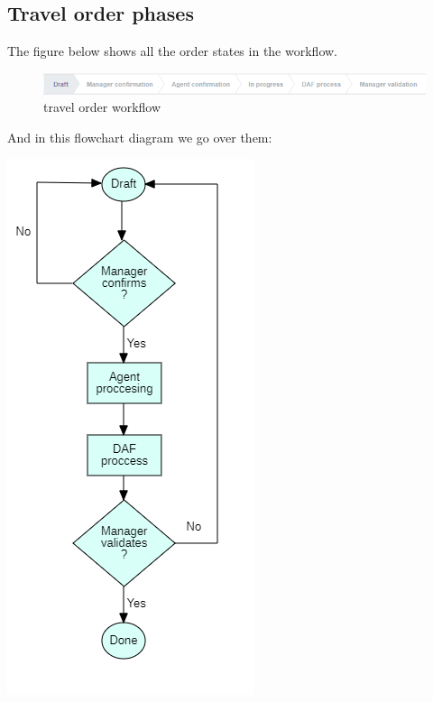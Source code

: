 \subsection*{Travel order phases}
The figure below shows all the order states in the workflow.
\begin{figure}[H]
    \begin{center}
        \includegraphics[scale=0.9]{img/workflow.png}
        \caption{travel order workflow}
    \end{center}
        \label{fig:my_label}
\end{figure} 
And in this flowchart diagram we go over them:
    \begin{center}
        \includegraphics[scale=0.6]{img/workflow2.png}
        \caption{travel order flowchart diagram}
    \end{center}
